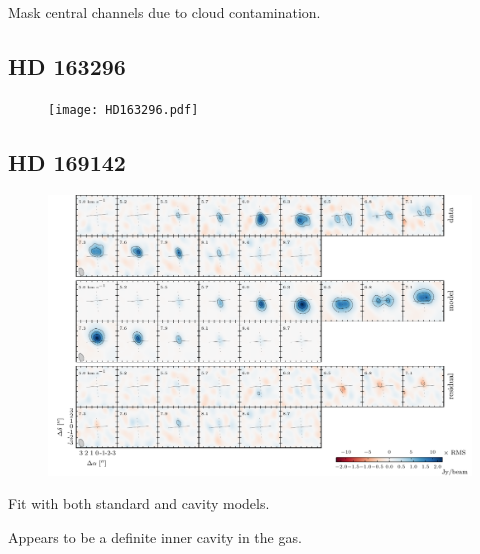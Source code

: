 \documentclass{aastex6}
\begin{document}
Mask central channels due to cloud contamination.

\subsection{HD 163296}

\begin{figure}[htb]
\begin{center}
  \texttt{[image: HD163296.pdf]}
  \end{center}
\end{figure}

\subsection{HD 169142}

\begin{figure}[htb]
\begin{center}
  \includegraphics{HD169142.pdf}
  \end{center}
\end{figure}

Fit with both standard and cavity models.

Appears to be a definite inner cavity in the gas.
\end{document}
